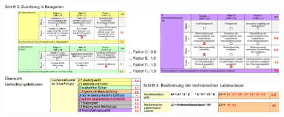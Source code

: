 \documentclass[fleqn,twoside,dvipsnames]{article}
\begin{document}
\begin{itemize}
\begin{itemize}
                        \includegraphics[width=0.4\textwidth]{Grafiken/Verfahren zur Bestimmung von Bauteillebensdauern/Alu-3.png}
                        \includegraphics[width=0.5\textwidth]{Grafiken/Verfahren zur Bestimmung von Bauteillebensdauern/Alu-3.1.png}\\
                        \includegraphics[width=0.45\textwidth]{Grafiken/Verfahren zur Bestimmung von Bauteillebensdauern/Alu-3.2.png}
                        \includegraphics[width=0.45\textwidth]{Grafiken/Verfahren zur Bestimmung von Bauteillebensdauern/Alu-4.png}
                        \vspace*{3mm}
                        

\end{itemize}
\end{itemize}
\end{document}
